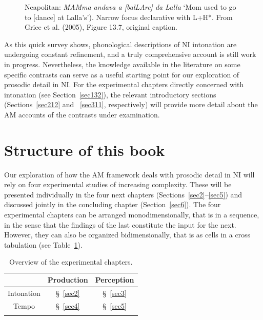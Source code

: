 \begin{figure}
\centering
{}
\caption{Neapolitan: \textit{MAMma andava a [balLAre] da Lalla} `Mom used to go to [dance] at Lalla's'). Narrow focus declarative with L+H*. From Grice et al. (2005), Figure 13.7, original caption.}
\label{fig103}\end{figure}

As this quick survey shows, phonological descriptions of NI intonation are undergoing constant refinement, and a truly comprehensive account is still work in progress. Nevertheless, the knowledge available in the literature on some specific contrasts can serve as a useful starting point for our exploration of prosodic detail in NI. For the experimental chapters directly concerned with intonation (see Section~\ref{sec132}), the relevant introductory sections (Sections~\ref{sec212} and ~\ref{sec311}, respectively) will provide more detail about the AM accounts of the contrasts under examination.

\section{Structure of this book}\label{sec13}
Our exploration of how the AM framework deals with prosodic detail in NI will rely on four experimental studies of increasing complexity. These will be presented individually in the four next chapters (Sections~\ref{sec2}--\ref{sec5}) and discussed jointly in the concluding chapter (Section~\ref{sec6}). The four experimental chapters can be arranged monodimensionally, that is in a sequence, in the sense that the findings of the last constitute the input for the next. However, they can also be organized bidimensionally, that is as cells in a cross tabulation (see Table~\ref{tab11}).

\begin{table}[h]
\centering
\begin{tabular}{c c c}
\mytoprule
& Production & Perception\\
\midrule
Intonation & §~\ref{sec2} & §~\ref{sec3}\\
Tempo & §~\ref{sec4} & §~\ref{sec5}\\
\mybottomrule
\end{tabular}
\caption{Overview of the experimental chapters.}
\label{tab11}\end{table}

